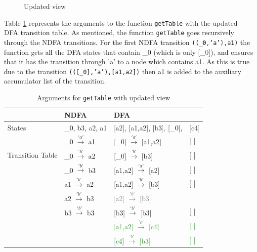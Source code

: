\begin{figure}
    \centering
    \caption{Updated view}
    \label{fig:updatedfa}
\end{figure}

Table \ref{getTable} represents the arguments to the function \texttt{getTable} with the updated DFA transition table.
As mentioned, the function \texttt{getTable} goes recursively through the NDFA transitions. For the first NDFA transition \texttt{((\_0,'a'),a1)} the function gets all the DFA states that contain \_0 (which is only [\_0]), and ensures that it has the transition through 'a' to a node which contains a1. As this is true due to the transition \texttt{(([\_0],'a'),[a1,a2])} then a1 is added to the auxiliary accumulator list of the transition.

\begin{table}[H]
  \begin{center}
    \begin{tabular}{ | p{3cm} |p{4cm}||p{3cm} p{1cm} |  }
    \hline
         & NDFA & DFA & \\ [1ex]
        \hline
        States & \_0, b3, a2, a1 & [a2], [a1,a2], [b3], [\_0], & [c4] \\ [0.7ex]
        \hline
        \multirow{3}{5em}{Transition Table} & \_0 $\xrightarrow{'a'}$ a1 & [\_0] $\xrightarrow{'a'}$ [a1,a2] & [ ]\\
        & \_0 $\xrightarrow{'b'}$ a2 & [\_0]    $\xrightarrow{'b'}$ [b3] & [ ]\\
        & \_0 $\xrightarrow{'b'}$ b3 & [a1,a2]  $\xrightarrow{'a'}$ [a2] & [ ]\\
        & a1  $\xrightarrow{'b'}$ a2 & [a1,a2]  $\xrightarrow{'b'}$ [b3] & [ ]\\
        & a2  $\xrightarrow{'b'}$ b3 & \textcolor{gray}{[a2]     $\xrightarrow{'b'}$ [b3]} &  \\
        & b3  $\xrightarrow{'b'}$ b3 & [b3]     $\xrightarrow{'b'}$ [b3] & [ ]\\
        &  & \textcolor{ForestGreen}{[a1,a2]  $\xrightarrow{'c'}$ [c4]} & \textcolor{ForestGreen}{[ ]}\\
        &  & \textcolor{ForestGreen}{[c4]  $\xrightarrow{'b'}$ [b3]} & \textcolor{ForestGreen}{[ ]}\\
        \hline
        \end{tabular}
  \end{center}
  \caption{Arguments for \texttt{getTable} with updated view}
  \label{getTable}
\end{table}


